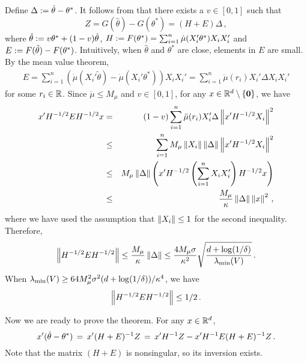 Define $\Delta := \hat{\theta}-\theta^*$. It follows from  that there exists a $v \in [0,1]$ such that
\[
Z=G(\hat{\theta})-G(\theta^*)=(H+E)\Delta\,,
\] 
where $\tilde{\theta} := v \theta^*+(1-v)\hat{\theta}$, $H := F(\theta^*)=\sum_{i=1}^{n}\dot{\mu}(X_i' \theta^*)X_iX_i' $ and $E := F(\tilde{\theta})-F(\theta^*)$. Intuitively, when $\hat{\theta}$ and $\theta^*$ are close, elements in $E$ are small.  By the mean value theorem, 
\begin{eqnarray*}
E =\sum_{i=1}^{n} \left(\dot{\mu}(X_i'\tilde{\theta}) - \dot{\mu}(X_i'{\theta^*})\right)X_iX_i'= \sum_{i=1}^{n} \ddot{\mu}(r_i)X_i'\Delta X_iX_i'
\end{eqnarray*}
for some $r_i \in \mathbb{R}$. Since $\ddot{\mu} \le M_\mu$ and $v \in [0,1]$, for any $x \in \mathbb{R}^d \setminus \{\mathbf{0}\}$, we have
\begin{eqnarray*}
x' H^{-1/2}EH^{-1/2} x &=& (1-v) \sum_{i=1}^{n} \ddot{\mu}(r_i) X_i' \Delta \left\|x' H^{-1/2} X_i\right\|^2 \\
&\le& \sum_{i=1}^{n} M_\mu \left\|X_i\right\| \left\|\Delta\right\| \left\|x' H^{-1/2} X_i\right\|^2 \\
&\le& M_\mu \left\|\Delta\right\|  \left( x' H^{-1/2} \left(\sum_{i=1}^{n} X_i X_i' \right) H^{-1/2} x \right) \\ 
&\le& \frac{M_\mu }{\kappa} \left\|\Delta\right\| \left\|x\right\|^2\,,
\end{eqnarray*}
where we have used the assumption that $\left\|X_i\right\| \le 1$ for the second inequality. Therefore,
\begin{equation}
\left\|H^{-1/2}EH^{-1/2}\right\| \le \frac{M_\mu}{\kappa} \left\|\Delta\right\| \le  \frac{4M_\mu \sigma}{\kappa^2} \sqrt{\frac{d + \log(1/\delta)}{\lambda_{\min}(V)}}\,. \label{eqn:normality}
\end{equation}
When $\lambda_{\min}(V) \ge 64 M_\mu^2 \sigma^2(d + \log(1/\delta))/\kappa^4$, we have
\begin{equation}
\left\|H^{-1/2}EH^{-1/2}\right\| \le 1/2\,.
\label{eqn:half}
\end{equation}

Now we are ready to prove the theorem. For any $x \in \mathbb{R}^d$, 
\begin{equation} 
x' (\hat{\theta}-\theta^*) \,=\, x' (H+E)^{-1} Z \,=\, x' H^{-1} Z - x' H^{-1} E (H+E)^{-1} Z\,.
\label{eqn:decomposition}
\end{equation}
Note that the matrix $(H+E)$ is nonsingular, so its inversion exists.

